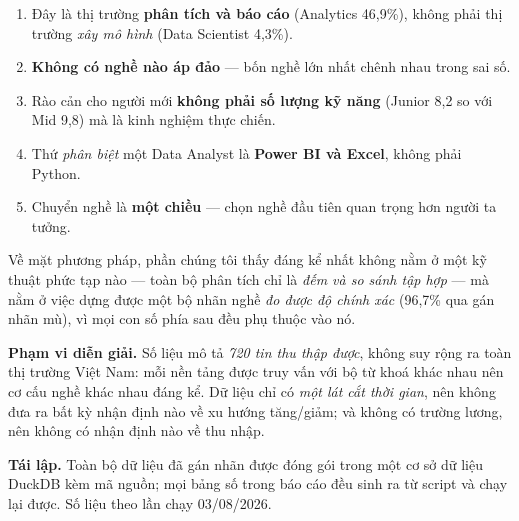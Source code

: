 \documentclass[10pt]{article}
\begin{document}
\begin{enumerate}
\item Đây là thị trường \textbf{phân tích và báo cáo} (Analytics 46,9\%), không phải thị trường
      \emph{xây mô hình} (Data Scientist 4,3\%).
\item \textbf{Không có nghề nào áp đảo} --- bốn nghề lớn nhất chênh nhau trong sai số.
\item Rào cản cho người mới \textbf{không phải số lượng kỹ năng} (Junior 8,2 so với Mid 9,8) mà là kinh
      nghiệm thực chiến.
\item Thứ \emph{phân biệt} một Data Analyst là \textbf{Power BI và Excel}, không phải Python.
\item Chuyển nghề là \textbf{một chiều} --- chọn nghề đầu tiên quan trọng hơn người ta tưởng.
\end{enumerate}

Về mặt phương pháp, phần chúng tôi thấy đáng kể nhất không nằm ở một kỹ thuật phức tạp nào --- toàn bộ
phân tích chỉ là \emph{đếm và so sánh tập hợp} --- mà nằm ở việc dựng được một bộ nhãn nghề \emph{đo được
độ chính xác} (96,7\% qua gán nhãn mù), vì mọi con số phía sau đều phụ thuộc vào nó.

\vspace{4pt}
{\footnotesize
\textbf{Phạm vi diễn giải.} Số liệu mô tả \emph{720 tin thu thập được}, không suy rộng ra toàn thị trường
Việt Nam: mỗi nền tảng được truy vấn với bộ từ khoá khác nhau nên cơ cấu nghề khác nhau đáng kể. Dữ liệu
chỉ có \emph{một lát cắt thời gian}, nên không đưa ra bất kỳ nhận định nào về xu hướng tăng/giảm; và
không có trường lương, nên không có nhận định nào về thu nhập.

\textbf{Tái lập.} Toàn bộ dữ liệu đã gán nhãn được đóng gói trong một cơ sở dữ liệu DuckDB kèm mã nguồn;
mọi bảng số trong báo cáo đều sinh ra từ script và chạy lại được. Số liệu theo lần chạy 03/08/2026.}
\end{document}
